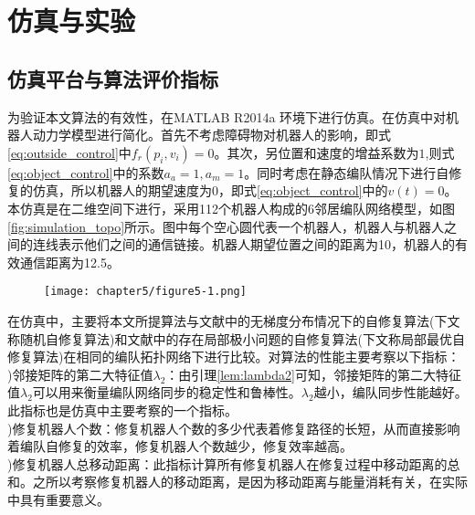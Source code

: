\chapter{仿真与实验}

\section{仿真平台与算法评价指标}
为验证本文算法的有效性，在MATLAB R2014a 环境下进行仿真。在仿真中对机器人动力学模型进行简化。首先不考虑障碍物对机器人的影响，即式\ref{eq:outside_control}中$f_r(p_i,v_i) = 0$。其次，另位置和速度的增益系数为$1$,则式\ref{eq:object_control}中的系数$a_a=1, a_m=1$。同时考虑在静态编队情况下进行自修复的仿真，所以机器人的期望速度为0，即式\ref{eq:object_control}中的$v(t) = 0$。本仿真是在二维空间下进行，采用112个机器人构成的6邻居编队网络模型，如图\ref{fig:simulation_topo}所示。图中每个空心圆代表一个机器人，机器人与机器人之间的连线表示他们之间的通信链接。机器人期望位置之间的距离为10，机器人的有效通信距离为12.5。
\begin{figure}[!htbp]
	\centering
	\texttt{[image: chapter5/figure5-1.png]}
\end{figure}

在仿真中，主要将本文所提算法与文献\parencite{张飞2008移动机器人覆盖问题的研究}中的无梯度分布情况下的自修复算法(下文称随机自修复算法)和文献\parencite{liu2015gradient}中的存在局部极小问题的自修复算法(下文称局部最优自修复算法)在相同的编队拓扑网络下进行比较。对算法的性能主要考察以下指标：\\
)邻接矩阵的第二大特征值$\lambda_2$：由引理\ref{lem:lambda2}可知，邻接矩阵的第二大特征值$\lambda_2$可以用来衡量编队网络同步的稳定性和鲁棒性。$\lambda_2$越小，编队同步性能越好。此指标也是仿真中主要考察的一个指标。\\
)修复机器人个数：修复机器人个数的多少代表着修复路径的长短，从而直接影响着编队自修复的效率，修复机器人个数越少，修复效率越高。\\
)修复机器人总移动距离：此指标计算所有修复机器人在修复过程中移动距离的总和。之所以考察修复机器人的移动距离，是因为移动距离与能量消耗有关，在实际中具有重要意义。


